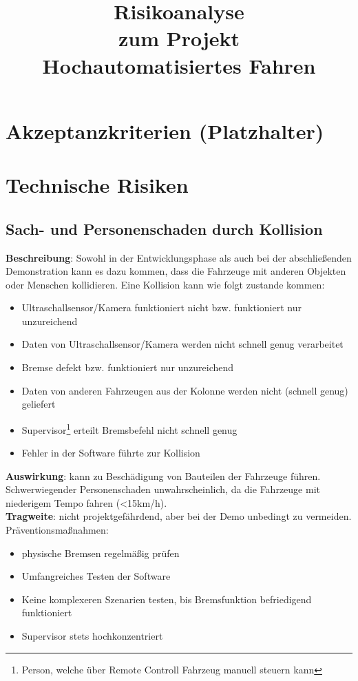 \documentclass[a4paper, 12pt, titlepage]{scrartcl}
\begin{document}
\title{Risikoanalyse\\zum Projekt\\Hochautomatisiertes Fahren} 
\publishers{Humboldt-Universit\"at zu Berlin}
\maketitle
\tableofcontents
\newpage

\section{Akzeptanzkriterien (Platzhalter)}
\section{Technische Risiken}
	\subsection{Sach- und Personenschaden durch Kollision}
		\textbf{Beschreibung}: Sowohl in der Entwicklungsphase als auch bei der abschlie\ss enden Demonstration kann es dazu kommen, dass die Fahrzeuge mit anderen Objekten oder Menschen kollidieren. Eine Kollision kann wie folgt zustande kommen: 
			\begin{itemize}
				\item Ultraschallsensor/Kamera funktioniert nicht bzw. funktioniert nur unzureichend
				\item Daten von Ultraschallsensor/Kamera werden nicht schnell genug verarbeitet
				\item Bremse defekt bzw. funktioniert nur unzureichend
				\item Daten von anderen Fahrzeugen aus der Kolonne werden nicht (schnell genug) geliefert
				\item Supervisor\footnote{Person, welche \"uber Remote Controll Fahrzeug manuell steuern kann} erteilt Bremsbefehl nicht schnell genug
				\item Fehler in der Software f\"uhrte zur Kollision
			\end{itemize}
		\textbf{Auswirkung}: kann zu Besch\"adigung von Bauteilen der Fahrzeuge f\"uhren. Schwerwiegender Personenschaden unwahrscheinlich, da die Fahrzeuge mit niederigem Tempo fahren (<15km/h).\\
		\textbf{Tragweite}: nicht projektgef\"ahrdend, aber bei der Demo unbedingt zu vermeiden.\\
		Pr\"aventionsma\ss nahmen:
			\begin{itemize}
				\item physische Bremsen regelm\"a\ss ig pr\"ufen
				\item Umfangreiches Testen der Software
				\item Keine komplexeren Szenarien testen, bis Bremsfunktion befriedigend funktioniert
				\item Supervisor stets hochkonzentriert 
			\end{itemize}
\end{document}
